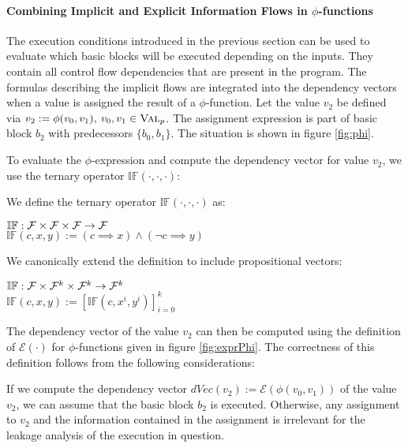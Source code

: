 \paragraph{Combining Implicit and Explicit Information Flows in $\phi$-functions}
The execution conditions introduced in the previous section can be used to evaluate which basic blocks will be executed depending on the inputs. They contain all control flow dependencies that are present in the program. The formulas describing the implicit flows are integrated into the dependency vectors when a value is assigned the result of a $\phi$-function. Let the value $v_2$ be defined via $v_2 := \phi(v_0, v_1), \: v_0, v_1 \in \textsc{Val}_p$. The assignment expression is part of basic block $b_2$ with predecessors $\{b_0, b_1\}$. The situation is shown in figure \ref{fig:phi}.

To evaluate the $\phi$-expression and compute the dependency vector for value $v_2$, we use the ternary operator $\mathbb{IF}(\cdot, \cdot, \cdot)$:

\begin{definition}
    We define the ternary operator $\mathbb{IF}(\cdot, \cdot, \cdot)$ as:
    \begin{center}
        $\mathbb{IF}: \mathcal{F} \times \mathcal{F} \times \mathcal{F} \to \mathcal{F}$\\
        $\mathbb{IF}(c, x, y) := (c \implies x) \land (\lnot c \implies y)$
    \end{center}
    We canonically extend the definition to include propositional vectors:
    \begin{center}
        $\mathbb{IF}: \mathcal{F} \times \mathcal{F}^k \times \mathcal{F}^k \to \mathcal{F}^k$\\
        $\mathbb{IF}(c, x, y) := [\mathbb{IF}(c, x^i, y^i)]_{i = 0}^k$
    \end{center}
\end{definition}

The dependency vector of the value $v_2$ can then be computed using the definition of $\mathcal{E}(\cdot)$ for $\phi$-functions given in figure \ref{fig:exprPhi}. The correctness of this definition follows from the following considerations:

If we compute the dependency vector $dVec(v_2) := \mathcal{E}(\phi(v_0, v_1))$ of the value $v_2$, we can assume that the basic block $b_2$ is executed. Otherwise, any assignment to $v_2$ and the information contained in the assignment is irrelevant for the leakage analysis of the execution in question.

